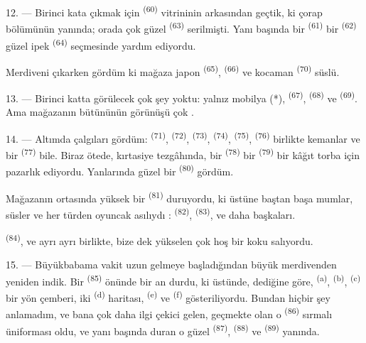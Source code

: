 12. --- Birinci kata çıkmak için  \textsuperscript{(60)}
vitrininin arkasından geçtik, ki çorap bölümünün yanında; orada çok güzel
 \textsuperscript{(63)} serilmişti. Yanı başında bir
 \textsuperscript{(61)} bir 
\textsuperscript{(62)} güzel ipek  \textsuperscript{(64)}
seçmesinde yardım ediyordu.

Merdiveni çıkarken gördüm ki mağaza japon 
\textsuperscript{(65)},  \textsuperscript{(66)} ve
kocaman  \textsuperscript{(70)} süslü.

13. --- Birinci katta görülecek çok şey yoktu: yalnız mobilya (*),
 \textsuperscript{(67)}, 
\textsuperscript{(68)} ve  \textsuperscript{(69)}. Ama
mağazanın bütününün görünüşü çok .

14. --- Altımda çalgıları gördüm:  \textsuperscript{(71)},
 \textsuperscript{(72)}, 
\textsuperscript{(73)},  \textsuperscript{(74)},
 \textsuperscript{(75)}, 
\textsuperscript{(76)} birlikte kemanlar ve bir 
\textsuperscript{(77)} bile. Biraz ötede, kırtasiye tezgâhında, bir
 \textsuperscript{(78)} bir 
\textsuperscript{(79)} bir kâğıt torba için pazarlık ediyordu. Yanlarında
güzel bir  \textsuperscript{(80)} gördüm.

Mağazanın ortasında yüksek bir  \textsuperscript{(81)}
duruyordu, ki üstüne baştan başa mumlar, süsler ve her türden oyuncak asılıydı
:  \textsuperscript{(82)}, 
\textsuperscript{(83)}, ve daha başkaları.

 \textsuperscript{(84)},  ve
ayrı ayrı  birlikte, bize dek yükselen çok hoş bir koku
salıyordu.

\VUsaut{3.4mm}
\VUsaut{2.8mm}

15. --- Büyükbabama vakit uzun gelmeye başladığından büyük merdivenden yeniden
indik. Bir  \textsuperscript{(85)} önünde bir an
durdu, ki üstünde, dediğine göre, 
\textsuperscript{(a)},  \textsuperscript{(b)},
 \textsuperscript{(c)}  bir yön çemberi, iki  \textsuperscript{(d)}
haritası,  \textsuperscript{(e)} ve 
\textsuperscript{(f)} gösteriliyordu. Bundan hiçbir şey anlamadım, ve bana çok
daha ilgi çekici gelen, geçmekte olan o 
\textsuperscript{(86)} sırmalı üniforması oldu, ve yanı başında duran o güzel
 \textsuperscript{(87)}, 
\textsuperscript{(88)} ve  \textsuperscript{(89)} yanında.

